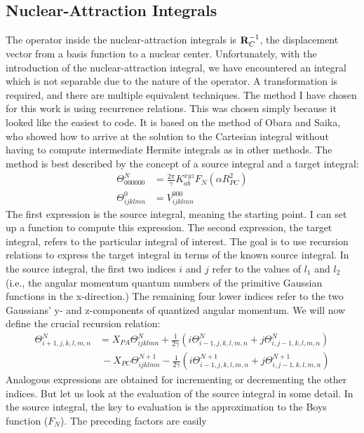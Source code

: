 \documentclass[12pt]{article}
\begin{document}
\subsection{Nuclear-Attraction Integrals}
The operator inside the nuclear-attraction integrals is ${\bf R}_C^{-1}$,
the displacement vector from a basis function to a nuclear center.
Unfortunately, with the introduction of the nuclear-attraction integral, 
we have encountered an integral which is not separable due to the nature of
the operator. A transformation is required, and there are multiple
equivalent techniques. The method I have chosen for this work is using
recurrence relations. This was chosen simply because it looked like the easiest to
code.  It is based on the method of Obara and Saika, who showed
how to arrive at the solution to the Cartesian integral without having
to compute intermediate Hermite integrals as in other methods.
The method is best described by the concept of a source integral
and a target integral:
\begin{align*}
\Theta_{000000}^N &=\frac{2\pi}{\gamma}K_{ab}^{xyz}F_N(\alpha R_{PC}^2) \\
\Theta_{ijklmn}^0 &= V_{ijklmn}^{000}
\end{align*}
The first expression is the source integral, meaning the starting point.
I can set up a function to compute this expression. The second expression, the target integral,
refers to the particular integral of interest. The goal is to use recursion relations
to express the target integral in terms of the known source integral.
In the source integral, the first two indices $i$ and $j$ refer to the values of $l_1$ and
$l_2$ (i.e., the angular momentum quantum numbers of the primitive Gaussian
functions in the x-direction.) The remaining four lower indices refer to the two Gaussians'
y- and z-components of quantized angular momentum.
We will now define the crucial recursion relation:
\begin{align*}
\Theta_{i+1,j,k,l,m,n}^N &= X_{PA}\Theta_{ijklmn}^N + \frac{1}{2\gamma}
\left(i\Theta_{i-1,j,k,l,m,n}^N+j\Theta_{i,j-1,k,l,m,n}^N\right) \\
& \ -X_{PC}\Theta_{ijklmn}^{N+1} - \frac{1}{2\gamma}
\left(i\Theta_{i-1,j,k,l,m,n}^{N+1} + j\Theta_{i,j-1,k,l,m,n}^{N+1}\right)
\end{align*}
Analogous expressions are obtained for incrementing or decrementing
the other indices. But let us look at the evaluation of the source integral
in some detail. In the source integral, the key to evaluation is the
approximation to the Boys function ($F_N$). The preceding factors are easily
\end{document}

